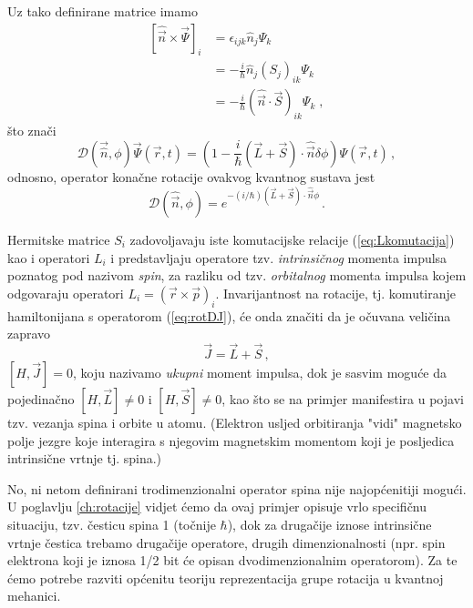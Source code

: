 Uz tako definirane matrice imamo
\begin{equation}
\begin{split}
[\hat{\vec{n}}\times\vec{\Psi}]_i &=
\epsilon_{ijk}\hat{n}_j\Psi_k \\
&= -\frac{i}{\hbar}\hat{n}_j (S_j)_{ik}\Psi_k\\
&= -\frac{i}{\hbar}(\hat{\vec{n}}\cdot\vec{S})_{ik}\Psi_k \;,
\end{split}
\end{equation}
što znači
\begin{equation*}
\mathcal{D}(\vec{\hat{n}},\phi)\vec{\Psi}(\vec{r}, t)=
 \left(1-\frac{i}{\hbar}(\vec{L}+\vec{S})\cdot\hat{\vec{n}}\delta\phi \right)
  \Psi(\vec{r}, t) \,,
\end{equation*}
odnosno, operator konačne rotacije ovakvog kvantnog sustava jest
\begin{equation}
\mathcal{D}(\hat{\vec{n}}, \phi)=
 e^{-(i/\hbar)(\vec{L}+\vec{S})\cdot\hat{\vec{n}}\phi} \,.
 \label{eq:rotDJ}
\end{equation}

Hermitske matrice $S_i$ zadovoljavaju iste komutacijske relacije
(\ref{eq:Lkomutacija}) kao i operatori $L_i$ i predstavljaju operatore tzv.
\emph{intrinsičnog}  momenta impulsa poznatog pod nazivom \emph{spin},
za razliku od tzv. \emph{orbitalnog} momenta impulsa kojem odgovaraju
operatori $L_i = (\vec{r}\times\vec{p})_{i}$.
Invarijantnost na rotacije, tj. komutiranje hamiltonijana s operatorom
(\ref{eq:rotDJ}), će onda značiti da je očuvana veličina zapravo
\begin{equation}
\vec{J}=\vec{L}+\vec{S} \,,
\end{equation}
$[H, \vec{J}] = 0$, koju nazivamo \emph{ukupni} moment impulsa, dok je sasvim moguće
da pojedinačno $[H, \vec{L}] \neq 0$ i $[H, \vec{S}] \neq 0$, kao što se na
primjer manifestira u pojavi tzv. vezanja spina i orbite u atomu.
(Elektron usljed orbitiranja "vidi" magnetsko polje
jezgre koje interagira s njegovim magnetskim momentom koji je posljedica
intrinsične vrtnje tj. spina.)

No, ni netom definirani trodimenzionalni operator spina nije najopćenitiji mogući.
U poglavlju \ref{ch:rotacije} vidjet ćemo da ovaj primjer opisuje
vrlo specifičnu situaciju, tzv. česticu spina 1 (točnije $\hbar$),
dok za drugačije iznose intrinsične vrtnje čestica trebamo drugačije
operatore, drugih dimenzionalnosti (npr. spin elektrona koji je iznosa 1/2 
bit će opisan dvodimenzionalnim operatorom).
Za te ćemo potrebe razviti općenitu teoriju
reprezentacija grupe rotacija u kvantnoj mehanici.

